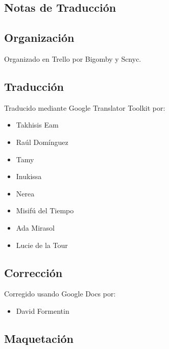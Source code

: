 \begin{center}
\section*{Notas de Traducción}
\end{center}

\mbox{}

\begingroup
\fontsize{9pt}{10pt}\selectfont
\parindent=0pt
\begin{multicols}{2}

\subsection*{Organización}\label{organizaciuxf3n}

Organizado en Trello por Bigomby y Scnyc.

\subsection*{Traducción}\label{traducciuxf3n}

Traducido mediante Google Translator Toolkit por:

\begin{itemize}
\itemsep1pt\parskip0pt
\item
  Takhisis Eam
\item
  Raúl Domínguez
\item
  Tamy
\item
  Inukissa
\item
  Nerea
\item
  Misifú del Tiempo
\item
  Ada Mirasol
\item
  Lucie de la Tour
\end{itemize}

\subsection*{Corrección}\label{correcciuxf3n}

Corregido usando Google Docs por:

\begin{itemize}
\itemsep1pt\parskip0pt
\item
  David Formentin
\end{itemize}

\subsection*{Maquetación}\label{maquetaciuxf3n}


\end{multicols}
